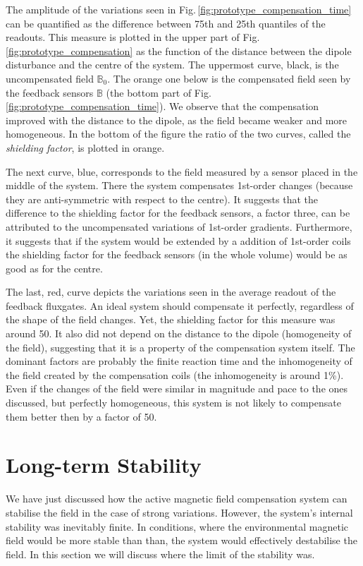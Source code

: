 The amplitude of the variations seen in Fig.\,\ref{fig:prototype_compensation_time} can be quantified as the difference between 75th and 25th quantiles of the readouts. This measure is plotted in the upper part of Fig.\,\ref{fig:prototype_compensation} as the function of the distance between the dipole disturbance and the centre of the system. The uppermost curve, black, is the uncompensated field $\mathbb{B}_0$. The orange one below is the compensated field seen by the feedback sensors $\mathbb{B}$ (the bottom part of Fig.\,\ref{fig:prototype_compensation_time}). We observe that the compensation improved with the distance to the dipole, as the field became weaker and more homogeneous. In the bottom of the figure the ratio of the two curves, called the \emph{shielding factor}, is plotted in orange.

The next curve, blue, corresponds to the field measured by a sensor placed in the middle of the system. There the system compensates 1st-order changes (because they are anti-symmetric with respect to the centre). It suggests that the difference to the shielding factor for the feedback sensors, a factor three, can be attributed to the uncompensated variations of 1st-order gradients. Furthermore, it suggests that if the system would be extended by a addition of 1st-order coils the shielding factor for the feedback sensors (in the whole volume) would be as good as for the centre.

The last, red, curve depicts the variations seen in the average readout of the feedback fluxgates. An ideal system should compensate it perfectly, regardless of the shape of the field changes. Yet, the shielding factor for this measure was around 50. It also did not depend on the distance to the dipole (homogeneity of the field), suggesting that it is a property of the compensation system itself. The dominant factors are probably the finite reaction time and the inhomogeneity of the field created by the compensation coils (the inhomogeneity is around 1\%). Even if the changes of the field were similar in magnitude and pace to the ones discussed, but perfectly homogeneous, this system is not likely to compensate them better then by a factor of 50.




\section{Long-term Stability}
We have just discussed how the active magnetic field compensation system can stabilise the field in the case of strong variations. However, the system's internal stability was inevitably finite. In conditions, where the environmental magnetic field would be more stable than than, the system would effectively destabilise the field. In this section we will discuss where the limit of the stability was.

